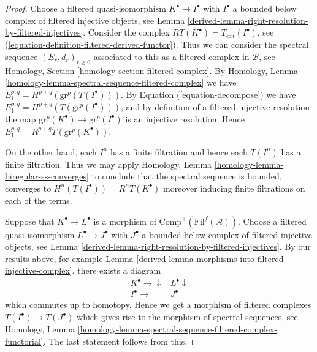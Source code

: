 \begin{proof}

Choose a filtered quasi-isomorphism $K^\bullet \to I^\bullet$
with $I^\bullet$ a bounded below complex of filtered injective objects, see
Lemma \ref{derived-lemma-right-resolution-by-filtered-injectives}.
Consider the complex $RT(K^\bullet) = T_{ext}(I^\bullet)$, see
(\ref{equation-definition-filtered-derived-functor}).
Thus we can consider the spectral sequence
$(E_r, d_r)_{r \geq 0}$ associated to
this as a filtered complex in $\mathcal{B}$, see
Homology, Section \ref{homology-section-filtered-complex}.
By
Homology, Lemma \ref{homology-lemma-spectral-sequence-filtered-complex}
we have $E_1^{p, q} = H^{p + q}(\text{gr}^p(T(I^\bullet)))$.
By Equation (\ref{equation-decompose}) we have
$E_1^{p, q} = H^{p + q}(T(\text{gr}^p(I^\bullet)))$, and
by definition of a filtered injective resolution the
map $\text{gr}^p(K^\bullet) \to \text{gr}^p(I^\bullet)$
is an injective resolution. Hence
$E_1^{p, q} = R^{p + q}T(\text{gr}^p(K^\bullet))$.

\medskip\noindent
On the other hand, each $I^n$ has a finite filtration and hence
each $T(I^n)$ has a finite filtration. Thus we may apply
Homology, Lemma \ref{homology-lemma-biregular-ss-converges}
to conclude that the spectral sequence is bounded, converges to
$H^n(T(I^\bullet)) = R^nT(K^\bullet)$
moreover inducing finite filtrations on each of the terms.

\medskip\noindent
Suppose that $K^\bullet \to L^\bullet$ is a morphism of
$\text{Comp}^{+}(\text{Fil}^f(\mathcal{A}))$.
Choose a filtered quasi-isomorphism $L^\bullet \to J^\bullet$
with $J^\bullet$ a bounded below complex of filtered injective
objects, see
Lemma \ref{derived-lemma-right-resolution-by-filtered-injectives}.
By our results above,
for example
Lemma \ref{derived-lemma-morphisms-into-filtered-injective-complex},
there exists a diagram
$$
\begin{array}{cc}K^\bullet \longrightarrow\downarrow & L^\bullet \downarrow \\ I^\bullet \longrightarrow & J^\bullet\end{array}
$$
which commutes up to homotopy. Hence we get a morphism of filtered
complexes $T(I^\bullet) \to T(J^\bullet)$ which gives rise to the
morphism of spectral sequences, see
Homology,
Lemma \ref{homology-lemma-spectral-sequence-filtered-complex-functorial}.
The last statement follows from this.
\end{proof}

